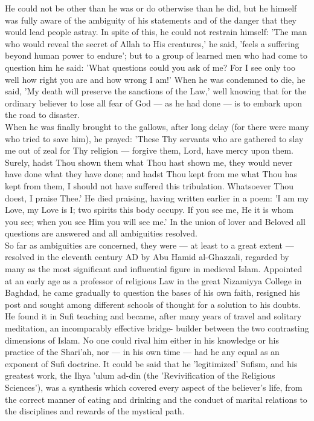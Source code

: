 \documentclass[10pt, twoside]{book}
\begin{document}
He could not be other than he was or do otherwise than he did, but he himself was fully aware of the 
ambiguity of his statements and of the danger that they would lead people astray. In spite of this, 
he could not restrain himself: 'The man who would reveal the secret of Allah to His creatures,' he 
said, 'feels a suffering beyond human power to endure'; but to a group of learned men who had come to 
question him he said: 'What questions could you ask of me? For I see only too well how right you are 
and how wrong I am!' When he was condemned to die, he said, 'My death will preserve the sanctions of 
the Law,' well knowing that for the ordinary believer to lose all fear of God --- as he had done --- is 
to embark upon the road to disaster. \\

When he was finally brought to the gallows, after long delay (for there were many who tried to save 
him), he prayed: 'These Thy servants who are gathered to slay me out of zeal for Thy religion --- 
forgive them, Lord, have mercy upon them. Surely, hadst Thou shown them what Thou hast shown me, they 
would never have done what they have done; and hadst Thou kept from me what Thou has kept from them, 
I should not have suffered this tribulation. Whatsoever Thou doest, I praise Thee.' He died praising, 
having written earlier in a poem: 'I am my Love, my Love is I; two spirits this body occupy. If you 
see me, He it is whom you see; when you see Him you will see me.' In the union of lover and Beloved 
all questions are answered and all ambiguities resolved. \\

So far as ambiguities are concerned, they were --- at least to a great extent --- resolved in the eleventh 
century AD by Abu Hamid al\hyp{}Ghazzali, regarded by many as the most significant and influential figure 
in medieval Islam. Appointed at an early age as a professor of religious Law in the great Nizamiyya 
College in Baghdad, he came gradually to question the bases of his own faith, resigned his post and 
sought among different schools of thought for a solution to his doubts. He found it in Sufi teaching 
and became, after many years of travel and solitary meditation, an incomparably effective bridge\hyp{}
builder between the two contrasting dimensions of Islam. No one could rival him either in his 
knowledge or his practice of the Shari'ah, nor --- in his own time --- had he any equal as an exponent of 
Sufi doctrine. It could be said that he 'legitimized' Sufism, and his greatest work, the Ihya 'ulum 
ad\hyp{}din (the 'Revivification of the Religious Sciences'), was a synthesis which covered every aspect 
of the believer's life, from the correct manner of eating and drinking and the conduct of marital 
relations to the disciplines and rewards of the mystical path. \\
\end{document}
